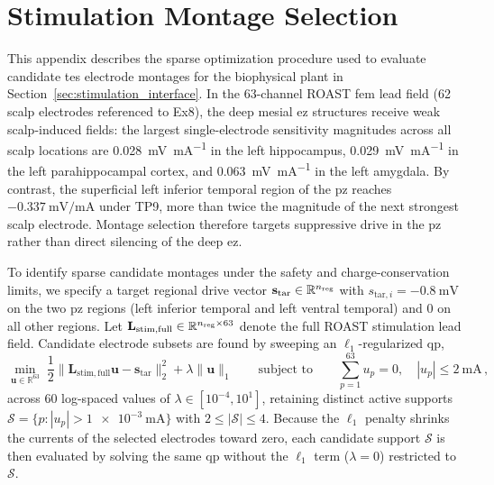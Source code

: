 \chapter{Stimulation Montage Selection}\label{app:montage_selection}

This appendix describes the sparse optimization procedure used to evaluate candidate \ac{tes} electrode montages for the biophysical plant in Section~\ref{sec:stimulation_interface}.
In the 63-channel ROAST \ac{fem} lead field (62 scalp electrodes referenced to Ex8), the deep mesial \ac{ez} structures receive weak scalp-induced fields: the largest single-electrode sensitivity magnitudes across all scalp locations are \SI{0.028}{\milli\volt\per\milli\ampere} in the left hippocampus, \SI{0.029}{\milli\volt\per\milli\ampere} in the left parahippocampal cortex, and \SI{0.063}{\milli\volt\per\milli\ampere} in the left amygdala.
By contrast, the superficial left inferior temporal region of the \ac{pz} reaches $-\SI{0.337}{\milli\volt\per\milli\ampere}$ under TP9, more than twice the magnitude of the next strongest scalp electrode.
Montage selection therefore targets suppressive drive in the \ac{pz} rather than direct silencing of the deep \ac{ez}.

To identify sparse candidate montages under the safety and charge-conservation limits, we specify a target regional drive vector $\mathbf{s}_{\mathrm{tar}}\in\mathbb{R}^{n_{\mathrm{reg}}{}}$ with $s_{\mathrm{tar},i}=-\SI{0.8}{\milli\volt}$ on the two \ac{pz} regions (left inferior temporal and left ventral temporal) and $0$ on all other regions.
Let $\mathbf{L}_{\mathrm{stim,full}}\in\mathbb{R}^{n_{\mathrm{reg}}{}\times 63}$ denote the full ROAST stimulation lead field.
Candidate electrode subsets are found by sweeping an $\ell_1$-regularized \ac{qp},
\begin{equation*}
  \min_{\mathbf{u}\in\mathbb{R}^{63}}\;
  \frac{1}{2}\bigl\lVert\mathbf{L}_{\mathrm{stim,full}}\mathbf{u}-\mathbf{s}_{\mathrm{tar}}\bigr\rVert_2^2
  + \lambda\lVert\mathbf{u}\rVert_1
  \qquad\text{subject to}\qquad
  \sum_{p=1}^{63}u_p = 0,\quad |u_p|\le\SI{2}{\milli\ampere}\,,
\end{equation*}
across 60 log-spaced values of $\lambda\in[10^{-4},10^{1}]$, retaining distinct active supports $\mathcal{S}=\{p:|u_p|>\SI{1e-3}{\milli\ampere}\}$ with $2\le|\mathcal{S}|\le 4$.
Because the $\ell_1$ penalty shrinks the currents of the selected electrodes toward zero, each candidate support $\mathcal{S}$ is then evaluated by solving the same \ac{qp} without the $\ell_1$ term ($\lambda=0$) restricted to $\mathcal{S}$.

